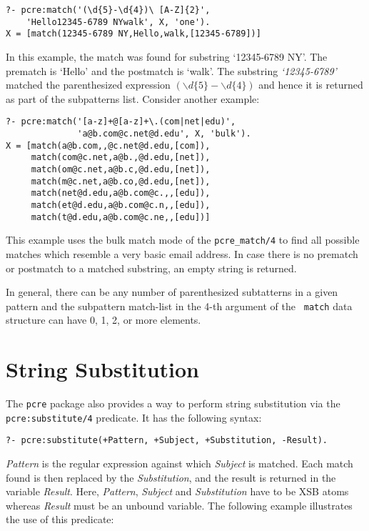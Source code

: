 \begin{verbatim}
?- pcre:match('(\d{5}-\d{4})\ [A-Z]{2}',
	'Hello12345-6789 NYwalk', X, 'one').
X = [match(12345-6789 NY,Hello,walk,[12345-6789])]
\end{verbatim}

In this example, the match was found for substring `12345-6789 NY'. The
prematch is `Hello' and the postmatch is `walk'. The substring
\textit{`12345-6789'} matched the parenthesized expression $ ( \backslash d
\lbrace 5 \rbrace - \backslash d \lbrace 4 \rbrace ) $ and hence it is
returned as part of the subpatterns list. Consider another example:

\begin{verbatim}
?- pcre:match('[a-z]+@[a-z]+\.(com|net|edu)', 
              'a@b.com@c.net@d.edu', X, 'bulk').
X = [match(a@b.com,,@c.net@d.edu,[com]),
     match(com@c.net,a@b.,@d.edu,[net]),
     match(om@c.net,a@b.c,@d.edu,[net]),
     match(m@c.net,a@b.co,@d.edu,[net]),
     match(net@d.edu,a@b.com@c.,,[edu]),
     match(et@d.edu,a@b.com@c.n,,[edu]),
     match(t@d.edu,a@b.com@c.ne,,[edu])]
\end{verbatim}

This example uses the bulk match mode of the {\tt pcre\_match/4} to find
all possible matches which resemble a very basic email address. In case
there is no prematch or postmatch to a matched substring, an empty string
is returned.

In general, there can be any number of parenthesized subtatterns in a given
pattern and the subpattern match-list in the 4-th argument of the {\tt
  match} data structure can have 0, 1, 2, or more elements. 


\section{String Substitution}


The {\tt pcre} package also provides a way to perform string substitution
via the {\tt pcre:substitute/4}  predicate. It has the following syntax:

\begin{verbatim}
?- pcre:substitute(+Pattern, +Subject, +Substitution, -Result).
\end{verbatim}

\textit{Pattern} is the regular expression against which \textit{Subject}
is matched. Each match found is then replaced by the \textit{Substitution},
and the result is returned in the variable \textit{Result}. Here,
\textit{Pattern}, \textit{Subject} and \textit{Substitution} have to be XSB
atoms whereas \textit{Result} must be an unbound variable. The following
example illustrates the use of this predicate:

